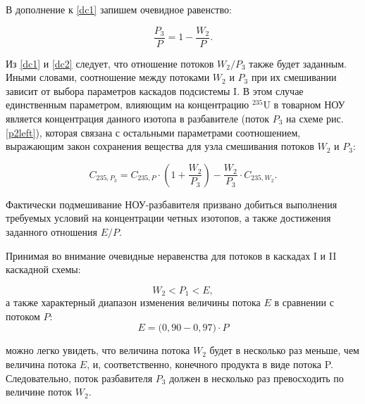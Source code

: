В дополнение к \ref{dc1} запишем очевидное равенство:

\begin{equation}
    \label{dc2}
    \frac{P_{3}}{P} = 1 - \frac{W_{2}}{P}.
\end{equation}

Из \ref{dc1} и \ref{dc2} следует, что отношение потоков ${W_2}{/}{P_3}$ также будет заданным. Иными словами, соотношение между потоками $W_2$ и $P_3$ при их смешивании зависит от выбора параметров каскадов подсистемы I. В этом случае единственным параметром, влияющим на концентрацию $^{235}$U в товарном НОУ является концентрация данного изотопа в разбавителе (поток $P_3$ на схеме рис. \ref{p2left}), которая связана с остальными параметрами соотношением, выражающим закон сохранения вещества для узла смешивания потоков $W_2$ и $P_3$: 

\begin{equation}
    \label{dc3}
    C_{235,P_{3}}=C_{235,P} \cdot ({1 + \frac{W_{2}}{P_{3}}}) - \frac{W_{2}}{P_{3}}\cdot C_{235,W_{2}}.
\end{equation}

Фактически подмешивание НОУ-разбавителя призвано добиться выполнения требуемых условий на концентрации четных изотопов, а также достижения заданного отношения $E{/}P$.

Принимая во внимание очевидные неравенства для потоков в каскадах I и II каскадной схемы:

\begin{equation}
    \label{dc3a}
    W_{2} < P_{1} <  E,
\end{equation}
а также характерный диапазон изменения величины потока $E$ в сравнении с потоком $P$:
\begin{equation}
    \label{dc3b}
    E = {(}0,90-0,97{)} \cdot P
\end{equation}

можно легко увидеть, что величина потока $W_{2}$ будет в несколько раз меньше, чем величина потока $E$, и, соответственно, конечного продукта в виде потока P. Следовательно, поток разбавителя $P_{3}$ должен в несколько раз превосходить по величине поток $W_{2}$. 

